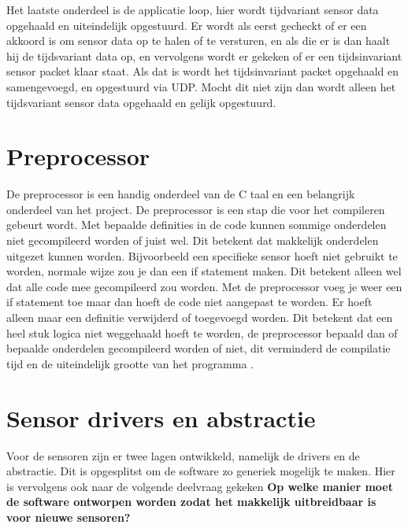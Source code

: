 \noindent Het laatste onderdeel is de applicatie loop, hier wordt tijdvariant sensor data opgehaald en uiteindelijk opgestuurd. Er wordt als eerst gecheckt of er een akkoord is om sensor data op te halen of te versturen, en als die er is dan haalt hij de tijdsvariant data op, en vervolgens wordt er gekeken of er een tijdsinvariant sensor packet klaar staat. Als dat is wordt het tijdsinvariant packet opgehaald en samengevoegd, en opgestuurd via UDP. Mocht dit niet zijn dan wordt alleen het tijdsvariant sensor data opgehaald en gelijk opgestuurd. \newline

\section{Preprocessor} \label{sec:preprocessor}
De preprocessor is een handig onderdeel van de C taal en een belangrijk onderdeel van het project. De preprocessor is een stap die voor het compileren gebeurt wordt. Met bepaalde definities in de code kunnen sommige onderdelen niet gecompileerd worden of juist wel. Dit betekent dat makkelijk onderdelen uitgezet kunnen worden. Bijvoorbeeld een specifieke sensor hoeft niet gebruikt te worden, normale wijze zou je dan een if statement maken. Dit betekent alleen wel dat alle code mee gecompileerd zou worden. Met de preprocessor voeg je weer een if statement toe maar dan hoeft de code niet aangepast te worden. Er hoeft alleen maar een definitie verwijderd of toegevoegd worden. Dit betekent dat een heel stuk logica niet weggehaald hoeft te worden, de preprocessor bepaald dan of bepaalde onderdelen gecompileerd worden of niet, dit verminderd de compilatie tijd en de uiteindelijk grootte van het programma \autocite{preprocessor}. 

\section{Sensor drivers en abstractie}
Voor de sensoren zijn er twee lagen ontwikkeld, namelijk de drivers en de abstractie. Dit is opgesplitst om de software zo generiek mogelijk te maken. Hier is vervolgens ook naar de volgende deelvraag gekeken \textbf{Op welke manier moet de software ontworpen worden zodat het makkelijk uitbreidbaar is voor nieuwe sensoren?} \newline 

